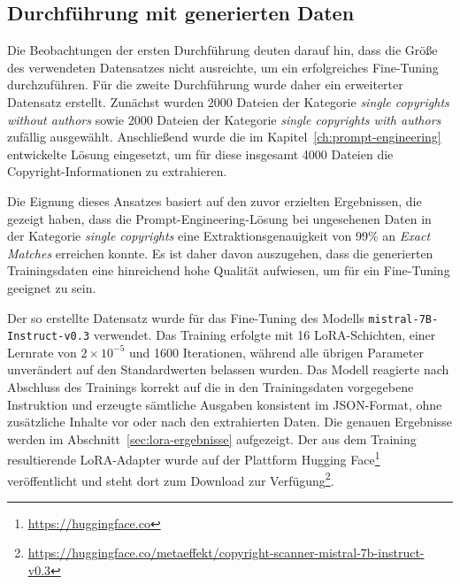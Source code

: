 \subsection{Durchführung mit generierten Daten}

Die Beobachtungen der ersten Durchführung deuten darauf hin, dass die Größe des verwendeten Datensatzes nicht ausreichte, um ein erfolgreiches Fine-Tuning durchzuführen.
Für die zweite Durchführung wurde daher ein erweiterter Datensatz erstellt.
Zunächst wurden 2000 Dateien der Kategorie \textit{single copyrights without authors} sowie 2000 Dateien der Kategorie \textit{single copyrights with authors} zufällig ausgewählt.
Anschließend wurde die im Kapitel~\ref{ch:prompt-engineering} entwickelte Lösung eingesetzt, um für diese insgesamt 4000 Dateien die Copyright-Informationen zu extrahieren.

Die Eignung dieses Ansatzes basiert auf den zuvor erzielten Ergebnissen, die gezeigt haben, dass die Prompt-Engineering-Lösung bei ungesehenen Daten in der Kategorie \textit{single copyrights} eine Extraktionsgenauigkeit von \num{99}\% an \textit{Exact Matches} erreichen konnte.
Es ist daher davon auszugehen, dass die generierten Trainingsdaten eine hinreichend hohe Qualität aufwiesen, um für ein Fine-Tuning geeignet zu sein.

Der so erstellte Datensatz wurde für das Fine-Tuning des Modells \texttt{mistral-7B-Instruct-v0.3} verwendet.
Das Training erfolgte mit 16 LoRA-Schichten, einer Lernrate von $2 \times 10^{-5}$ und \num{1600} Iterationen, während alle übrigen Parameter unverändert auf den Standardwerten belassen wurden.
Das Modell reagierte nach Abschluss des Trainings korrekt auf die in den Trainingsdaten vorgegebene Instruktion und erzeugte sämtliche Ausgaben konsistent im JSON-Format, ohne zusätzliche Inhalte vor oder nach den extrahierten Daten.
Die genauen Ergebnisse werden im Abschnitt~\ref{sec:lora-ergebnisse} aufgezeigt.
Der aus dem Training resultierende LoRA-Adapter wurde auf der Plattform Hugging Face\footnote{\url{https://huggingface.co}} veröffentlicht und steht dort zum Download zur Verfügung\footnote{\url{https://huggingface.co/metaeffekt/copyright-scanner-mistral-7b-instruct-v0.3}}.

